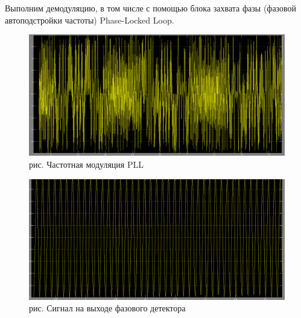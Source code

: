 \documentclass[10pt,a4paper]{report}
\begin{document}
Выполним демодуляцию, в том числе с помощью блока захвата фазы (фазовой автоподстройки частоты) Phase-Locked Loop.
\begin{figure}
\begin{center}
\includegraphics[width=150mm, scale = 0.9]{8_11}\newline
рис. Частотная модуляция PLL\newline
\end{center}
\end{figure}
\begin{figure}
\begin{center}
\includegraphics[width=150mm, scale = 0.9]{8_12}\newline
рис. Сигнал на выходе фазового детектора\newline
\end{center}
\end{figure}
\end{document}
